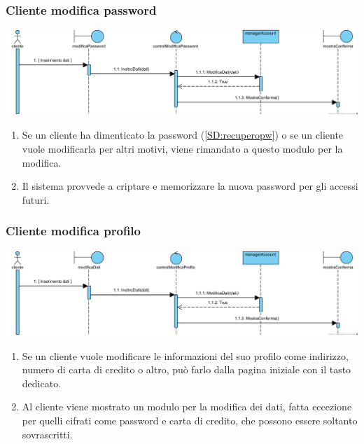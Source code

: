 \documentclass[12pt,a4paper]{article}
\begin{document}
\subsubsection{Cliente modifica password}
\label{SD:modificapw}

\begin{center}
\includegraphics[width=\textwidth]{SequenceDiagram/ClientePasswordModifica}
\end{center}

\begin{enumerate}
\item Se un cliente ha dimenticato la password (\ref{SD:recuperopw}) o se un cliente vuole modificarla per altri motivi, viene rimandato a questo modulo per la modifica.
\item Il sistema provvede a criptare e memorizzare la nuova password per gli accessi futuri.
\end{enumerate}

\subsubsection{Cliente modifica profilo}
\label{SD:modificaprofilo}
\begin{center}
\includegraphics[width=\textwidth]{SequenceDiagram/ClienteProfiloModifica}
\end{center}

\begin{enumerate}
\item Se un cliente vuole modificare le informazioni del suo profilo come indirizzo, numero di carta di credito o altro, può farlo dalla pagina iniziale con il tasto dedicato.
\item Al cliente viene mostrato un modulo per la modifica dei dati, fatta eccezione per quelli cifrati come password e carta di credito, che possono essere soltanto sovrascritti.
\end{enumerate}
\end{document}
